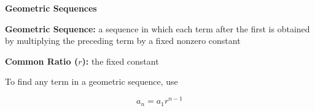 \begin{center}
\textbf{Geometric Sequences}
\end{center}

\vspace*{1ex}

\textbf{Geometric Sequence:} a sequence in which each term after the first is obtained by multiplying the preceding term by a fixed nonzero constant 

\vspce

\textbf{Common Ratio ($r$):} the fixed constant 

\vspce

To  find  any  term  in  a  geometric sequence, use

$$a_{n} = a_{1}r^{n - 1}$$ 


